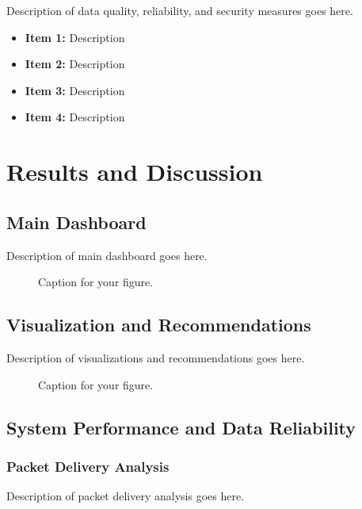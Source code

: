 \documentclass[12pt]{article}
\begin{document}
Description of data quality, reliability, and security measures goes here.

\begin{itemize}
    \item \textbf{Item 1:} Description
    \item \textbf{Item 2:} Description
    \item \textbf{Item 3:} Description
    \item \textbf{Item 4:} Description
\end{itemize}

\section{Results and Discussion}

\subsection{Main Dashboard}

Description of main dashboard goes here.

\begin{figure}[htbp]
    \centering
    \caption{Caption for your figure.}
    \label{fig:dashboard}
\end{figure}

\subsection{Visualization and Recommendations}

Description of visualizations and recommendations goes here.

\begin{figure}[htbp]
    \centering
    \caption{Caption for your figure.}
    \label{fig:dashboard-sample}
\end{figure}

\subsection{System Performance and Data Reliability}

\subsubsection{Packet Delivery Analysis}

Description of packet delivery analysis goes here.
\end{document}
